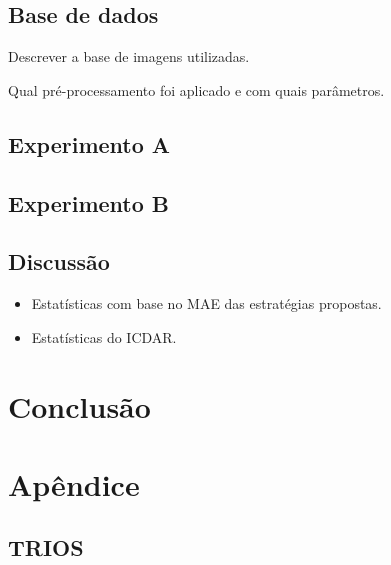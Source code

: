 \documentclass[a4paper,11pt]{article}
\begin{document}
\subsection{Base de dados}
Descrever a base de imagens utilizadas.

Qual pré-processamento foi aplicado e com quais parâmetros.


\subsection{Experimento A}

\subsection{Experimento B}


\subsection{Discussão}

      \begin{itemize}
        \item Estatísticas com base no MAE das estratégias propostas.
        \item Estatísticas do ICDAR.
      \end{itemize}



\section{Conclusão}




\section{Apêndice}

\subsection{TRIOS}
\end{document}
